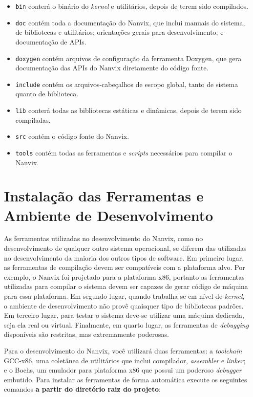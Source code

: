 \documentclass[11pt]{article}
\begin{document}
\begin{itemize}
    \item \texttt{bin} conterá o binário do \textit{kernel} e utilitários, depois de terem sido compilados.
    \item \texttt{doc} contém toda a documentação do Nanvix, que inclui manuais do sistema, de bibliotecas e utilitários; orientações gerais para desenvolvimento; e documentação de APIs.
    \item \texttt{doxygen} contém arquivos de configuração da ferramenta Doxygen, que gera documentação das APIs do Nanvix diretamente do código fonte.
    \item \texttt{include} contém os arquivos-cabeçalhos de escopo global, tanto de sistema quanto de biblioteca.
    \item \texttt{lib} conterá todas as bibliotecas estáticas e dinâmicas, depois de terem sido compiladas.
    \item \texttt{src} contém o código fonte do Nanvix.
    \item \texttt{tools} contém todas as ferramentas e \textit{scripts} necessários para compilar o Nanvix.
\end{itemize}

\section{Instalação das Ferramentas e Ambiente de Desenvolvimento}
\label{sec:ferramentas}

As ferramentas utilizadas no desenvolvimento do Nanvix, como no desenvolvimento de qualquer outro sistema operacional, se diferem das utilizadas no desenvolvimento da maioria dos outros tipos de software. Em primeiro lugar, as ferramentas de compilação devem ser compatíveis com a plataforma alvo. Por exemplo, o Nanvix foi projetado para a plataforma x86, portanto as ferramentas utilizadas para compilar o sistema devem ser capazes de gerar código de máquina para essa plataforma. Em segundo lugar, quando trabalha-se em nível de \textit{kernel}, o ambiente de desenvolvimento não provê quaisquer tipo de bibliotecas padrões. Em terceiro lugar, para testar o sistema deve-se utilizar uma máquina dedicada, seja ela real ou virtual. Finalmente, em quarto lugar, as ferramentas de \textit{debugging} disponíveis são restritas, mas extremamente poderosas.

Para o desenvolvimento do Nanvix, você utilizará duas ferramentas: a \textit{toolchain} GCC-x86, uma coletânea de utilitários que inclui compilador, \textit{assembler} e \textit{linker}; e o Bochs, um emulador para plataforma x86 que possui um poderoso \textit{debugger} embutido. Para instalar as ferramentas de forma automática execute os seguintes comandos \textbf{a partir do diretório raiz do projeto}:
\end{document}
